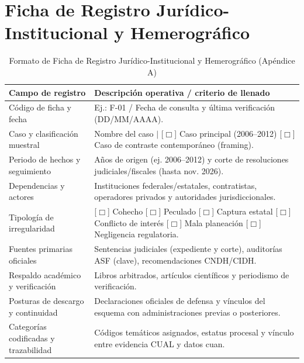 \documentclass[12pt,letterpaper,oneside]{article}
\begin{document}
\clearpage


\nocite{*}


\clearpage


\appendix

\section{Ficha de Registro Jurídico-Institucional y Hemerográfico}

\begin{table}[H]
\centering
\caption{Formato de Ficha de Registro Jurídico-Institucional y Hemerográfico (Apéndice A)}
\label{tab:ficha}
\small
\begin{tabular}{@{}p{4cm}p{10cm}@{}}
\toprule
\textbf{Campo de registro} & \textbf{Descripción operativa / criterio de llenado} \\
\midrule
Código de ficha y fecha & Ej.: F-01 / Fecha de consulta y última verificación (DD/MM/AAAA). \\
\addlinespace
Caso y clasificación muestral & Nombre del caso $|$ [$\Box$] Caso principal (2006--2012) [$\Box$] Caso de contraste contemporáneo (framing). \\
\addlinespace
Periodo de hechos y seguimiento & Años de origen (ej. 2006--2012) y corte de resoluciones judiciales/fiscales (hasta nov. 2026). \\
\addlinespace
Dependencias y actores & Instituciones federales/estatales, contratistas, operadores privados y autoridades jurisdiccionales. \\
\addlinespace
Tipología de irregularidad & [$\Box$] Cohecho [$\Box$] Peculado [$\Box$] Captura estatal [$\Box$] Conflicto de interés [$\Box$] Mala planeación [$\Box$] Negligencia regulatoria. \\
\addlinespace
Fuentes primarias oficiales & Sentencias judiciales (expediente y corte), auditorías ASF (clave), recomendaciones CNDH/CIDH. \\
\addlinespace
Respaldo académico y verificación & Libros arbitrados, artículos científicos y periodismo de verificación. \\
\addlinespace
Posturas de descargo y continuidad & Declaraciones oficiales de defensa y vínculos del esquema con administraciones previas o posteriores. \\
\addlinespace
Categorías codificadas y trazabilidad & Códigos temáticos asignados, estatus procesal y vínculo entre evidencia CUAL y datos cuan. \\
\bottomrule
\end{tabular}
\end{table}
\end{document}
